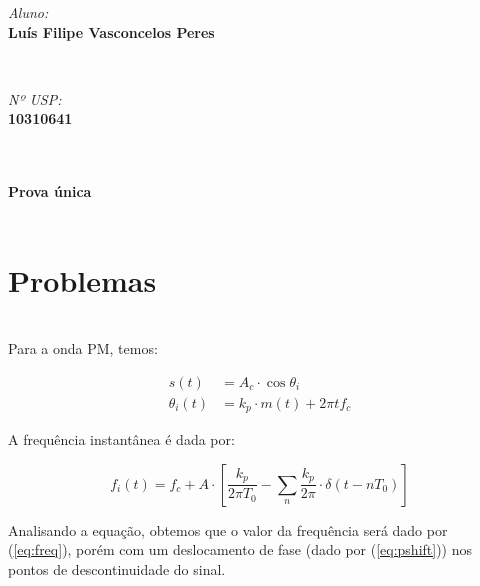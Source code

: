 \begin{minipage}{0.52\textwidth}
\begin{flushleft} \large
\emph{Aluno:}\\
\textbf{Luís Filipe Vasconcelos Peres} %
\end{flushleft}
\end{minipage}
~
\begin{minipage}{0.45\textwidth}
\begin{flushright} \large
\emph{Nº USP:} \\
\textbf{10310641} %
\end{flushright}
\end{minipage}\\

\center
\HRule \\[0.4cm]
{ \LARGE \bfseries Prova única}\\ %
\HRule \\[0.2cm]

\justify
\section*{Problemas}
\section{}

Para a onda PM, temos:

\begin{align*}
    s (t) &= A_c \cdot \cos\theta_i\\
    \theta_i (t) &= k_p \cdot m(t) + 2\pi t f_c
\end{align*}

A frequência instantânea é dada por:

$$
    f_i(t) = f_c + A\cdot\left[ \frac{k_p}{2\pi T_0}
    - \sum_n \frac{k_p}{2\pi} \cdot \delta(t - nT_0)\right]
$$

Analisando a equação, obtemos que o valor da frequência será dado por (\ref{eq:freq}), porém com um deslocamento de fase (dado por (\ref{eq:pshift})) nos pontos de descontinuidade do sinal.

